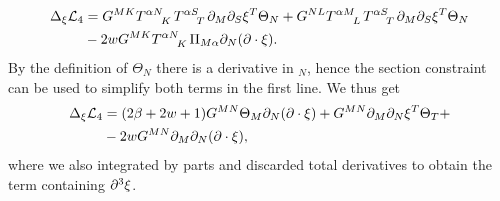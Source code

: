\begin{equation}
    \begin{aligned}
    \Delta_\xi \mathcal{L}_4 &= G^{MK}\tensor{T}{^{\alpha N}_K}\tensor{T}{^{\alpha S}_T}\pd_M\pd_S\xi^T\Theta_N+G^{NL}\tensor{T}{^{\alpha M}_L}\tensor{T}{^{\alpha S}_T}\pd_M\pd_S\xi^T\Theta_N\\
    &-2wG^{MK}\tensor{T}{^{\alpha N}_K}\Pi_{M\alpha}\pd_N(\pd\cdot\xi).
    \end{aligned}
\end{equation}
By the definition of $\Theta_{N}$ there is a derivative in $_N$, hence the section constraint can be used to simplify both terms in the first line. We thus get
\begin{equation}
    \begin{aligned}
    \Delta_\xi \mathcal{L}_4 &= (2\beta+2w+1)G^{MN}\Theta_M\partial_N(\partial\cdot\xi)+G^{MN}\partial_M\partial_N\xi^T\Theta_T+\\
    &-2wG^{MN}\partial_M\partial_N(\partial\cdot\xi),
    \end{aligned}
\end{equation}
where we also integrated by parts and discarded total derivatives to obtain the term containing $\partial^3\xi$. 

